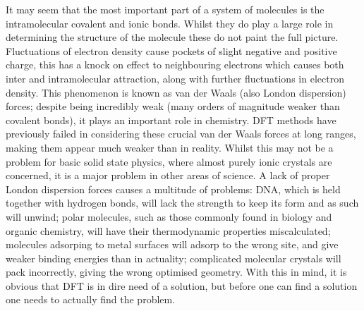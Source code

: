 \documentclass[10pt,a4paper,twocolumn,twoside]{extarticle}
\begin{document}
	It may seem that the most important part of a system of molecules is the intramolecular covalent and ionic bonds. Whilst they do play a large role in determining the structure of the molecule these do not paint the full picture. Fluctuations of electron density cause pockets of slight negative and positive charge, this has a knock on effect to neighbouring electrons which causes both inter and intramolecular attraction, along with further fluctuations in electron density. This phenomenon is known as van der Waals (also London dispersion) forces; despite being incredibly weak (many orders of magnitude weaker than covalent bonds), it plays an important role in chemistry.\cite{vdWImportance-Kaplan2006}
	DFT methods have previously failed in considering these crucial van der Waals forces at long ranges, making them appear much weaker than in reality. Whilst this may not be a problem for basic solid state physics, where almost purely ionic crystals are concerned, it is a major problem in other areas of science. A lack of proper London dispersion forces causes a multitude of problems: DNA, which is held together with hydrogen bonds, will lack the strength to keep its form and as such will unwind; polar molecules, such as those commonly found in biology and organic chemistry, will have their thermodynamic properties miscalculated; molecules adsorping to metal surfaces will adsorp to the wrong site, and give weaker binding energies than in actuality; complicated molecular crystals will pack incorrectly, giving the wrong optimised geometry.
	With this in mind, it is obvious that DFT is in dire need of a solution, but before one can find a solution one needs to actually find the problem. 
\end{document}
